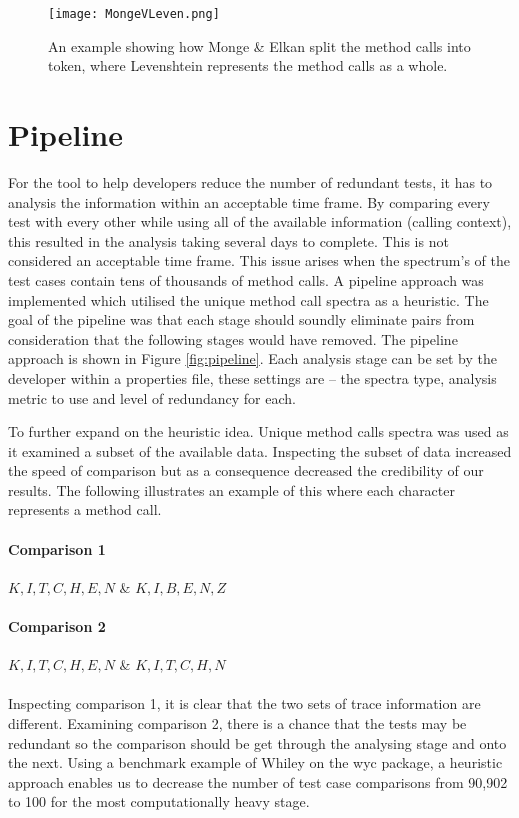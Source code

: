 \begin{figure}[h]
\begin{center}
\texttt{[image: MongeVLeven.png]}
\end{center}
\caption{An example showing how Monge \& Elkan split the method calls into token, where Levenshtein represents the method calls as a whole.}
\label{fig:mongevleven}
\end{figure}

\section{Pipeline}
\label{pipelinesection}
For the tool to help developers reduce the number of redundant tests, it has to analysis the information within an acceptable time frame. By comparing every test with every other while using all of the available information (calling context), this resulted in the analysis taking several days to complete. This is not considered an acceptable time frame. This issue arises when the spectrum's of the test cases contain tens of thousands of method calls. A pipeline approach was implemented which utilised the unique method call spectra as a heuristic. The goal of the pipeline was that each stage should soundly eliminate pairs from consideration that the following stages would have removed. The pipeline approach is shown in Figure \ref{fig:pipeline}. Each analysis stage can be set by the developer within a properties file, these settings are -- the spectra type, analysis metric to use and level of redundancy for each.

To further expand on the heuristic idea. Unique method calls spectra was used as it examined a subset of the available data. Inspecting the subset of data increased the speed of comparison but as a consequence decreased the credibility of our results. The following illustrates an example of this where each character represents a method call.
\paragraph{Comparison 1}
$K,I,T,C,H,E,N$ \& $K,I,B,E,N,Z $
\paragraph{Comparison 2}
$K,I,T,C,H,E,N$ \& $K,I,T,C,H,N$
\paragraph{}
Inspecting comparison 1, it is clear that the two sets of trace information are different. Examining comparison 2, there is a chance that the tests may be redundant so the comparison should be get through the analysing stage and onto the next. Using a benchmark example of Whiley on the wyc package, a heuristic approach enables us to decrease the number of test case comparisons from 90,902 to 100 for the most computationally heavy stage.

